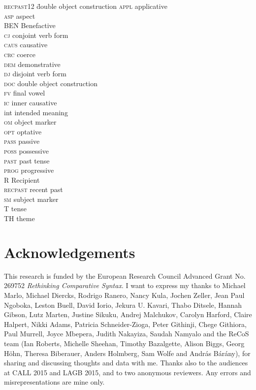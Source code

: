 \documentclass[output=paper]{LSP/langsci}
\begin{document}
\begin{multicols}{2}
\begin{tabbing}
\textsc{recpast12} \= double object construction\kill
\textsc{appl} \>  applicative\\
\textsc{asp} \>  aspect\\
BEN  \>  Benefactive\\
\textsc{cj} \>  conjoint verb form\\
\textsc{caus} \>  causative\\
\textsc{crc} \>  coerce\\
\textsc{dem} \>  demonstrative\\
\textsc{dj} \>  disjoint verb form\\
\textsc{doc} \>  double object construction\\
\textsc{fv} \> final vowel\\
\textsc{ic} \>  inner causative\\
int \> intended meaning\\
\textsc{om} \>  object marker\\
\textsc{opt} \>  optative\\
\textsc{pass} \>  passive\\
\textsc{poss} \>  possessive\\
\textsc{past} \>  past tense\\
\textsc{prog} \>  progressive\\
R  \>  Recipient\\
\textsc{recpast} \>  recent past\\
\textsc{sm} \>  subject marker\\
T   \> tense\\
TH   \> theme\\
\end{tabbing} 
\end{multicols}


\section*{Acknowledgements}

This research is funded by the European Research Council Advanced Grant No. 269752 \textit{Rethinking Comparative Syntax}. I want to express my thanks to Michael Marlo, Michael Diercks, Rodrigo Ranero, Nancy Kula, Jochen Zeller, Jean Paul Ngoboka, Leston Buell, David Iorio, Jekura U. Kavari, Thabo Ditsele, Hannah Gibson, Lutz Marten, Justine Sikuku, Andrej Malchukov, Carolyn Harford, Claire Halpert, Nikki Adams, Patricia Schneider-Zioga, Peter Githinji, Chege Githiora, Paul Murrell, Joyce Mbepera, Judith Nakayiza, Saudah Namyalo and the ReCoS team (Ian Roberts, Michelle Sheehan, Timothy Bazalgette, Alison Biggs, Georg Höhn, Theresa Biberauer, Anders Holmberg, Sam Wolfe and András Bárány), for sharing and discussing thoughts and data with me. Thanks also to the audiences at CALL 2015 and LAGB 2015, and to two anonymous reviewers. Any errors and misrepresentations are mine only.


{\sloppy
\printbibliography[heading=subbibliography,notkeyword=this]
}
\end{document}
